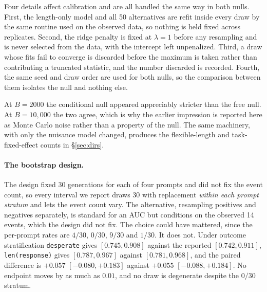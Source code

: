 Four details affect calibration and are all handled the same way in both nulls.
First, the length-only model and all 50 alternatives are refit inside every draw by
the same routine used on the observed data, so nothing is held fixed across
replicates. Second, the ridge penalty is fixed at $\lambda = 1$ before any
resampling and is never selected from the data, with the intercept left unpenalized.
Third, a draw whose fits fail to converge is discarded before the maximum is taken
rather than contributing a truncated statistic, and the number discarded is
recorded. Fourth, the same seed and draw order are used for both nulls, so the
comparison between them isolates the null and nothing else.

At $B = 2000$ the conditional null appeared appreciably stricter than the free null.
At $B = 10{,}000$ the two agree, which is why the earlier impression is reported here
as Monte Carlo noise rather than a property of the null. The same machinery, with
only the nuisance model changed, produces the flexible-length and task-fixed-effect
counts in \S\ref{sec:dirs}.

\paragraph{The bootstrap design.} The design fixed 30 generations for each of four
prompts and did not fix the event count, so every interval we report draws 30 with
replacement \emph{within each prompt stratum} and lets the event count vary. The
alternative, resampling positives and negatives separately, is standard for an AUC
but conditions on the observed 14 events, which the design did not fix. The choice
could have mattered, since the per-prompt rates are $4/30$, $0/30$, $9/30$ and
$1/30$. It does not. Under outcome stratification \texttt{desperate} gives
$[0.745, 0.908]$ against the reported $[0.742, 0.911]$, \texttt{len(response)}
gives $[0.787, 0.967]$ against $[0.781, 0.968]$, and the paired difference is
$+0.057$ $[-0.080, +0.183]$ against $+0.055$ $[-0.088, +0.184]$. No endpoint moves
by as much as $0.01$, and no draw is degenerate despite the $0/30$ stratum.
